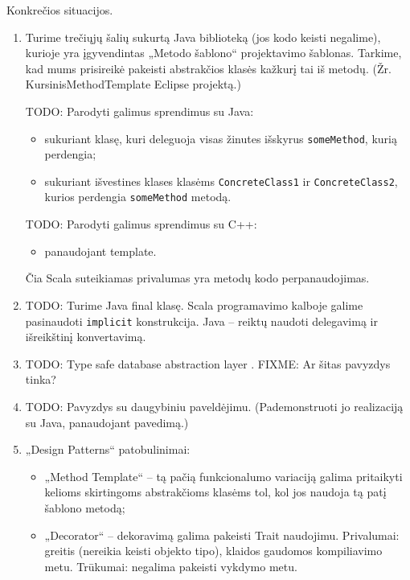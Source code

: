 Konkrečios situacijos.
\begin{enumerate}
  \item Turime trečiųjų šalių sukurtą Java biblioteką (jos kodo
    keisti negalime), kurioje yra įgyvendintas „Metodo šablono“
    projektavimo šablonas. Tarkime, kad mums prisireikė pakeisti
    abstrakčios klasės kažkurį tai iš metodų. (Žr. KursinisMethodTemplate
    Eclipse projektą.)

    TODO: Parodyti galimus sprendimus su Java:
    \begin{itemize}
      \item sukuriant klasę, kuri deleguoja visas žinutes išskyrus
        \verb|someMethod|, kurią perdengia;
      \item sukuriant išvestines klases klasėms \verb|ConcreteClass1|
        ir \verb|ConcreteClass2|, kurios perdengia \verb|someMethod|
        metodą.
    \end{itemize}

    TODO: Parodyti galimus sprendimus su C++:
    \begin{itemize}
      \item panaudojant template.
    \end{itemize}

    Čia Scala suteikiamas privalumas yra metodų kodo perpanaudojimas.

  \item TODO: Turime Java final klasę. Scala programavimo kalboje
    galime pasinaudoti \verb|implicit| konstrukcija. Java – reiktų
    naudoti delegavimą ir išreikštinį konvertavimą.
  \item TODO: Type safe database abstraction layer
    \cite[190]{beginning-scala}.
    FIXME: Ar šitas pavyzdys tinka?
  \item TODO: Pavyzdys su daugybiniu paveldėjimu. (Pademonstruoti jo
    realizaciją su Java, panaudojant pavedimą.)
  \item „Design Patterns“ patobulinimai:
    \begin{itemize}
      \item „Method Template“ – tą pačią funkcionalumo variaciją galima
        pritaikyti kelioms skirtingoms abstrakčioms klasėms tol, kol
        jos naudoja tą patį šablono metodą;
      \item „Decorator“ – dekoravimą galima pakeisti Trait naudojimu.
        Privalumai: greitis (nereikia keisti objekto tipo), klaidos
        gaudomos kompiliavimo metu.
        Trūkumai: negalima pakeisti vykdymo metu.


\end{itemize}
\end{enumerate}
